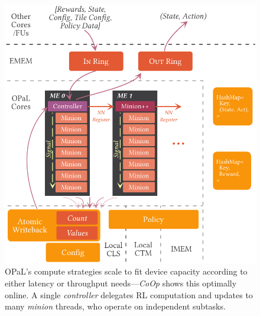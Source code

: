 \documentclass[
conference
,10pt
]{IEEEtran}
\newcommand{\approachshort}{OPaL}
\newcommand{\Coopfw}{\emph{CoOp}}
\newcommand{\Indfw}{\emph{Ind}}
\begin{document}

\begin{figure}
	\centering
	\includegraphics[keepaspectratio, width=0.8\linewidth]{figures/coop}
	\caption{\approachshort{}'s compute strategies scale to fit device capacity according to either latency or throughput needs---\Coopfw{} shows this optimally online. A single \emph{controller} delegates RL computation and updates to many \emph{minion} threads, who operate on independent subtasks.\label{fig:single-and-parallel:parallel}}
\end{figure}
\end{document}
